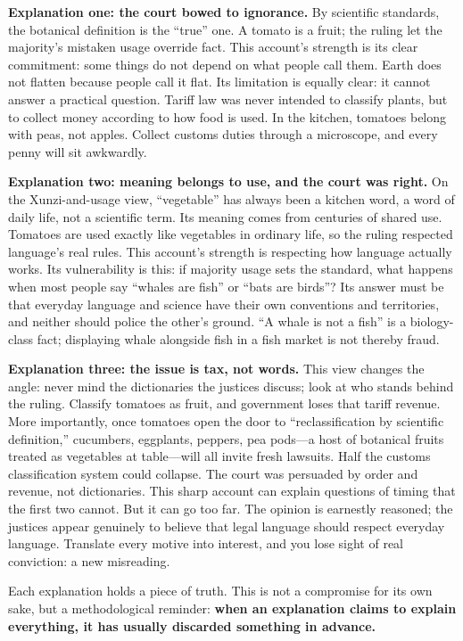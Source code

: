\textbf{Explanation one: the court bowed to ignorance.} By scientific standards, the botanical definition is the ``true'' one. A tomato is a fruit; the ruling let the majority's mistaken usage override fact. This account's strength is its clear commitment: some things do not depend on what people call them. Earth does not flatten because people call it flat. Its limitation is equally clear: it cannot answer a practical question. Tariff law was never intended to classify plants, but to collect money according to how food is used. In the kitchen, tomatoes belong with peas, not apples. Collect customs duties through a microscope, and every penny will sit awkwardly.

\textbf{Explanation two: meaning belongs to use, and the court was right.} On the Xunzi-and-usage view, ``vegetable'' has always been a kitchen word, a word of daily life, not a scientific term. Its meaning comes from centuries of shared use. Tomatoes are used exactly like vegetables in ordinary life, so the ruling respected language's real rules. This account's strength is respecting how language actually works. Its vulnerability is this: if majority usage sets the standard, what happens when most people say ``whales are fish'' or ``bats are birds''? Its answer must be that everyday language and science have their own conventions and territories, and neither should police the other's ground. ``A whale is not a fish'' is a biology-class fact; displaying whale alongside fish in a fish market is not thereby fraud.

\textbf{Explanation three: the issue is tax, not words.} This view changes the angle: never mind the dictionaries the justices discuss; look at who stands behind the ruling. Classify tomatoes as fruit, and government loses that tariff revenue. More importantly, once tomatoes open the door to ``reclassification by scientific definition,'' cucumbers, eggplants, peppers, pea pods---a host of botanical fruits treated as vegetables at table---will all invite fresh lawsuits. Half the customs classification system could collapse. The court was persuaded by order and revenue, not dictionaries. This sharp account can explain questions of timing that the first two cannot. But it can go too far. The opinion is earnestly reasoned; the justices appear genuinely to believe that legal language should respect everyday language. Translate every motive into interest, and you lose sight of real conviction: a new misreading.

Each explanation holds a piece of truth. This is not a compromise for its own sake, but a methodological reminder: \textbf{when an explanation claims to explain everything, it has usually discarded something in advance.}

